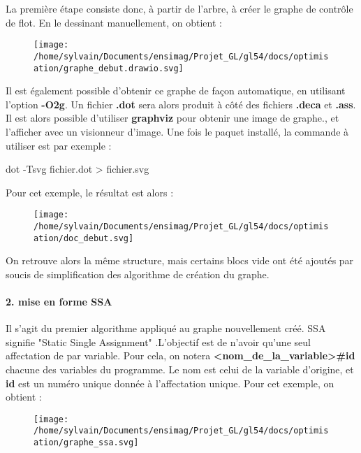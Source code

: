 \documentclass[
]{article}
\newenvironment{Shaded}{}{}
\newcommand{\NormalTok}[1]{#1}
\begin{document}
La première étape consiste donc, à partir de l'arbre, à créer le graphe
de contrôle de flot. En le dessinant manuellement, on obtient :

\begin{figure}
\centering
\texttt{[image: /home/sylvain/Documents/ensimag/Projet\_GL/gl54/docs/optimisation/graphe\_debut.drawio.svg]}
\caption{}
\end{figure}

Il est également possible d'obtenir ce graphe de façon automatique, en
utilisant l'option \textbf{-O2g}. Un fichier \textbf{.dot} sera alors
produit à côté des fichiers \textbf{.deca} et \textbf{.ass}. Il est
alors possible d'utiliser \textbf{graphviz} pour obtenir une image de
graphe., et l'afficher avec un visionneur d'image. Une fois le paquet
installé, la commande à utiliser est par exemple :

\begin{Shaded}
\begin{Highlighting}[]
\NormalTok{dot {-}Tsvg fichier.dot \textgreater{} fichier.svg}
\end{Highlighting}
\end{Shaded}

Pour cet exemple, le résultat est alors :

\begin{figure}
\centering
\texttt{[image: /home/sylvain/Documents/ensimag/Projet\_GL/gl54/docs/optimisation/doc\_debut.svg]}
\caption{}
\end{figure}

On retrouve alors la même structure, mais certains blocs vide ont été
ajoutés par soucis de simplification des algorithme de création du
graphe.

\hypertarget{2-mise-en-forme-ssa}{%
\paragraph{2. mise en forme SSA}\label{2-mise-en-forme-ssa}}

Il s'agit du premier algorithme appliqué au graphe nouvellement créé.
SSA signifie "Static Single Assignment" .L'objectif est de n'avoir
qu'une seul affectation de par variable. Pour cela, on notera
\textbf{\textless nom\_de\_la\_variable\textgreater\#id} chacune des
variables du programme. Le nom est celui de la variable d'origine, et
\textbf{id} est un numéro unique donnée à l'affectation unique. Pour cet
exemple, on obtient :

\begin{figure}
\centering
\texttt{[image: /home/sylvain/Documents/ensimag/Projet\_GL/gl54/docs/optimisation/graphe\_ssa.svg]}
\caption{}
\end{figure}
\end{document}
